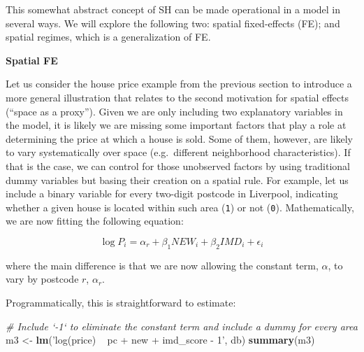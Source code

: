 \documentclass[]{book}
\newenvironment{Shaded}{\begin{snugshade}}{\end{snugshade}}
\newcommand{\KeywordTok}[1]{\textcolor[rgb]{0.13,0.29,0.53}{\textbf{#1}}}
\newcommand{\StringTok}[1]{\textcolor[rgb]{0.31,0.60,0.02}{#1}}
\newcommand{\CommentTok}[1]{\textcolor[rgb]{0.56,0.35,0.01}{\textit{#1}}}
\newcommand{\NormalTok}[1]{#1}
\begin{document}
This somewhat abstract concept of SH can be made operational in a model
in several ways. We will explore the following two: spatial
fixed-effects (FE); and spatial regimes, which is a generalization of
FE.

\textbf{Spatial FE}

Let us consider the house price example from the previous section to
introduce a more general illustration that relates to the second
motivation for spatial effects (``space as a proxy''). Given we are only
including two explanatory variables in the model, it is likely we are
missing some important factors that play a role at determining the price
at which a house is sold. Some of them, however, are likely to vary
systematically over space (e.g.~different neighborhood characteristics).
If that is the case, we can control for those unobserved factors by
using traditional dummy variables but basing their creation on a spatial
rule. For example, let us include a binary variable for every two-digit
postcode in Liverpool, indicating whether a given house is located
within such area (\texttt{1}) or not (\texttt{0}). Mathematically, we
are now fitting the following equation:

\[
\log{P_i} = \alpha_r + \beta_1 NEW_i + \beta_2 IMD_i + \epsilon_i
\]

where the main difference is that we are now allowing the constant term,
\(\alpha\), to vary by postcode \(r\), \(\alpha_r\).

Programmatically, this is straightforward to estimate:

\begin{Shaded}
\begin{Highlighting}[]
\CommentTok{# Include `-1` to eliminate the constant term and include a dummy for every area}
\NormalTok{m3 <-}\StringTok{ }\KeywordTok{lm}\NormalTok{(}\StringTok{'log(price) ~ pc + new + imd_score - 1'}\NormalTok{, db)}
\KeywordTok{summary}\NormalTok{(m3)}
\end{Highlighting}
\end{Shaded}
\end{document}
